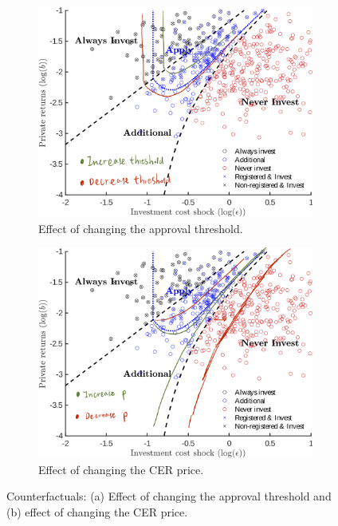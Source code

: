 \documentclass[12pt]{article}[margin=1in]
\begin{document}
\begin{itemize}
          \begin{figure}[htbp]
              \centering
              \begin{subfigure}[t]{0.45\textwidth}
                  \centering
                  \includegraphics[width=\textwidth]{figure_8_c2.png}
                  \caption{Effect of changing the approval threshold.}
                  \label{fig:threshold_effect}
              \end{subfigure}
              \hfill
              \begin{subfigure}[t]{0.45\textwidth}
                  \centering
                  \includegraphics[width=\textwidth]{figure_8_c1.png}
                  \caption{Effect of changing the CER price.}
                  \label{fig:price_effect}
              \end{subfigure}
              \caption{Counterfactuals: (a) Effect of changing the approval threshold and (b) effect of changing the CER price.}
              \label{fig:counterfactuals}
          \end{figure}

\end{itemize}
\end{document}
